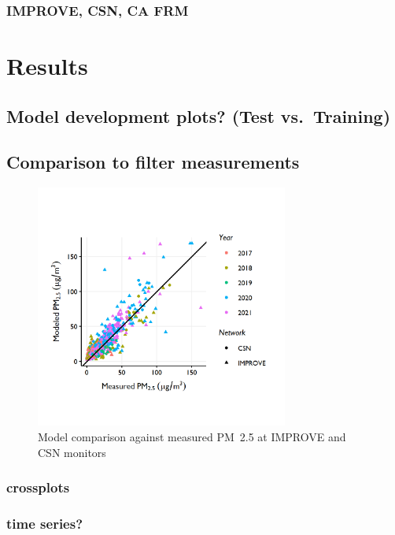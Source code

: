 \documentclass[gmd, manuscript]{copernicus}
\begin{document}
\subsubsection{IMPROVE, CSN, CA FRM}

\section{Results}

\subsection{Model development plots? (Test vs.~Training)}

\subsection{Comparison to filter measurements}

\begin{figure}
\includegraphics[width=8.3cm]{./Figures/Model_vs_Filters_FiveEpisodesGMD} \caption{Model comparison against measured PM~2.5 at IMPROVE and CSN monitors}\label{fig:unnamed-chunk-3}
\end{figure}

\subsubsection{crossplots}

\subsubsection{time series?}
\end{document}
